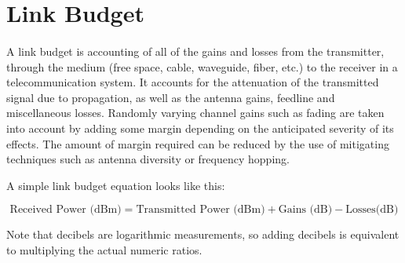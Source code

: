 \section{Link Budget}
\paragraph{}
A link budget is accounting of all of the gains and losses from the transmitter, through the medium (free space, cable, waveguide, fiber, etc.) to the receiver in a telecommunication system. It accounts for the attenuation of the transmitted signal due to propagation, as well as the antenna gains, feedline and miscellaneous losses. Randomly varying channel gains such as fading are taken into account by adding some margin depending on the anticipated severity of its effects. The amount of margin required can be reduced by the use of mitigating techniques such as antenna diversity or frequency hopping.

A simple link budget equation looks like this:

\begin{equation*}\label{eq:link_budget} 
 		\text{Received Power (dBm)} = \text{Transmitted Power (dBm)} + \text{Gains (dB)} - \text{Losses(dB)}
\end{equation*}

Note that decibels are logarithmic measurements, so adding decibels is equivalent to multiplying the actual numeric ratios.